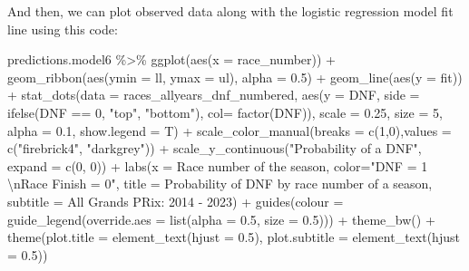 \documentclass[
]{book}
\newenvironment{Shaded}{\begin{snugshade}}{\end{snugshade}}
\newcommand{\AttributeTok}[1]{\textcolor[rgb]{0.77,0.63,0.00}{#1}}
\newcommand{\DecValTok}[1]{\textcolor[rgb]{0.00,0.00,0.81}{#1}}
\newcommand{\FloatTok}[1]{\textcolor[rgb]{0.00,0.00,0.81}{#1}}
\newcommand{\FunctionTok}[1]{\textcolor[rgb]{0.00,0.00,0.00}{#1}}
\newcommand{\NormalTok}[1]{#1}
\newcommand{\SpecialCharTok}[1]{\textcolor[rgb]{0.00,0.00,0.00}{#1}}
\newcommand{\StringTok}[1]{\textcolor[rgb]{0.31,0.60,0.02}{#1}}
\begin{document}
And then, we can plot observed data along with the logistic regression model fit line using this code:

\begin{Shaded}
\begin{Highlighting}[]
\NormalTok{predictions.model6 }\SpecialCharTok{\%\textgreater{}\%} 
  \FunctionTok{ggplot}\NormalTok{(}\FunctionTok{aes}\NormalTok{(}\AttributeTok{x =}\NormalTok{ race\_number)) }\SpecialCharTok{+}
  \FunctionTok{geom\_ribbon}\NormalTok{(}\FunctionTok{aes}\NormalTok{(}\AttributeTok{ymin =}\NormalTok{ ll, }\AttributeTok{ymax =}\NormalTok{ ul),}
              \AttributeTok{alpha =} \FloatTok{0.5}\NormalTok{) }\SpecialCharTok{+}
  \FunctionTok{geom\_line}\NormalTok{(}\FunctionTok{aes}\NormalTok{(}\AttributeTok{y =}\NormalTok{ fit)) }\SpecialCharTok{+}
  \FunctionTok{stat\_dots}\NormalTok{(}\AttributeTok{data =}\NormalTok{ races\_allyears\_dnf\_numbered,}
            \FunctionTok{aes}\NormalTok{(}\AttributeTok{y =}\NormalTok{ DNF, }
                \AttributeTok{side =} \FunctionTok{ifelse}\NormalTok{(DNF }\SpecialCharTok{==} \DecValTok{0}\NormalTok{, }\StringTok{"top"}\NormalTok{, }\StringTok{"bottom"}\NormalTok{), }\AttributeTok{col=} \FunctionTok{factor}\NormalTok{(DNF)),}
            \AttributeTok{scale =} \FloatTok{0.25}\NormalTok{, }\AttributeTok{size =} \DecValTok{5}\NormalTok{, }\AttributeTok{alpha =} \FloatTok{0.1}\NormalTok{, }\AttributeTok{show.legend =}\NormalTok{ T) }\SpecialCharTok{+}
  \FunctionTok{scale\_color\_manual}\NormalTok{(}\AttributeTok{breaks =} \FunctionTok{c}\NormalTok{(}\DecValTok{1}\NormalTok{,}\DecValTok{0}\NormalTok{),}\AttributeTok{values =} \FunctionTok{c}\NormalTok{(}\StringTok{"firebrick4"}\NormalTok{, }\StringTok{"darkgrey"}\NormalTok{)) }\SpecialCharTok{+}
  \FunctionTok{scale\_y\_continuous}\NormalTok{(}\StringTok{"Probability of a DNF"}\NormalTok{,}
                     \AttributeTok{expand =} \FunctionTok{c}\NormalTok{(}\DecValTok{0}\NormalTok{, }\DecValTok{0}\NormalTok{)) }\SpecialCharTok{+}
  \FunctionTok{labs}\NormalTok{(}\AttributeTok{x =} \StringTok{\textquotesingle{}Race number of the season\textquotesingle{}}\NormalTok{,}
       \AttributeTok{color=}\StringTok{"DNF = 1 }\SpecialCharTok{\textbackslash{}n}\StringTok{Race Finish = 0"}\NormalTok{,}
       \AttributeTok{title =} \StringTok{\textquotesingle{}Probability of DNF by race number of a season\textquotesingle{}}\NormalTok{,}
       \AttributeTok{subtitle =} \StringTok{\textquotesingle{}All Grands PRix: 2014 {-} 2023\textquotesingle{}}\NormalTok{) }\SpecialCharTok{+}
  \FunctionTok{guides}\NormalTok{(}\AttributeTok{colour =} \FunctionTok{guide\_legend}\NormalTok{(}\AttributeTok{override.aes =} \FunctionTok{list}\NormalTok{(}\AttributeTok{alpha =} \FloatTok{0.5}\NormalTok{, }\AttributeTok{size =} \FloatTok{0.5}\NormalTok{))) }\SpecialCharTok{+}
  \FunctionTok{theme\_bw}\NormalTok{() }\SpecialCharTok{+}
  \FunctionTok{theme}\NormalTok{(}\AttributeTok{plot.title =} \FunctionTok{element\_text}\NormalTok{(}\AttributeTok{hjust =} \FloatTok{0.5}\NormalTok{),}
        \AttributeTok{plot.subtitle =} \FunctionTok{element\_text}\NormalTok{(}\AttributeTok{hjust =} \FloatTok{0.5}\NormalTok{))}
\end{Highlighting}
\end{Shaded}
\end{document}
